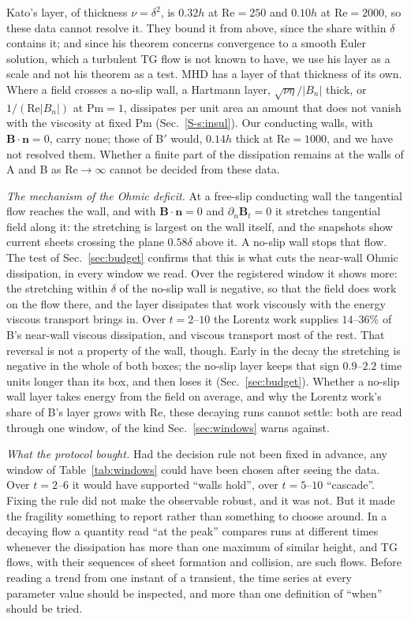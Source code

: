 \documentclass[aip,pop,reprint,amsmath,amssymb,superscriptaddress,floatfix]{revtex4-2}
\newcommand{\Rey}{\mathrm{Re}}
\newcommand{\BB}{\bm{B}}
\begin{document}
Kato's layer, of thickness $\nu=\delta^2$, is $0.32h$ at $\Rey=250$ and $0.10h$ at
$\Rey=2000$, so these data cannot resolve it. They bound it from above, since the
share within $\delta$ contains it; and since his theorem concerns convergence to a
smooth Euler solution,\cite{kato1984} which a turbulent TG flow is not known to have,
we use his layer as a scale and not his theorem as a test. MHD has a layer of that
thickness of its own. Where a field crosses a no-slip wall, a Hartmann
layer,\cite{sommeria1982,knaepen2008} $\sqrt{\nu\eta}/|B_n|$ thick, or $1/(\Rey|B_n|)$
at $\mathrm{Pm}=1$, dissipates per unit area an amount that does not vanish with the
viscosity at fixed $\mathrm{Pm}$ (Sec.~\ref{S-s:insul}). Our conducting walls, with
$\BB\cdot\bm{n}=0$, carry none; those of B$'$ would, $0.14h$ thick at $\Rey=1000$, and
we have not resolved them. Whether a finite part of the dissipation remains at the
walls of A and B as $\Rey\to\infty$ cannot be decided from these data.

\emph{The mechanism of the Ohmic deficit.} At a free-slip conducting wall the
tangential flow reaches the wall, and with $\BB\cdot\bm{n}=0$ and
$\partial_n\BB_t=0$ it stretches tangential field along it: the stretching is
largest on the wall itself, and the snapshots show current sheets crossing the plane
$0.58\delta$ above it. A no-slip wall stops that flow. The test of
Sec.~\ref{sec:budget} confirms that this is what cuts the near-wall Ohmic
dissipation, in every window we read. Over the registered window it shows more: the
stretching within $\delta$ of the no-slip wall is negative, so that the field does
work on the flow there, and the layer dissipates that work viscously with the energy
viscous transport brings in. Over $t=2$--$10$ the Lorentz work supplies $14$--$36$\%
of B's near-wall viscous dissipation, and viscous transport most of the rest. That
reversal is not a property of the wall, though. Early in the decay the stretching is
negative in the whole of both boxes; the no-slip layer keeps that sign $0.9$--$2.2$
time units longer than its box, and then loses it (Sec.~\ref{sec:budget}). Whether a
no-slip wall layer takes energy from the field on average, and why the Lorentz work's
share of B's layer grows with $\Rey$, these decaying runs cannot settle: both are read
through one window, of the kind Sec.~\ref{sec:windows} warns against.

\emph{What the protocol bought.} Had the decision rule not been fixed in advance, any
window of Table~\ref{tab:windows} could have been chosen after seeing the data. Over
$t=2$--$6$ it would have supported ``walls hold'', over $t=5$--$10$ ``cascade''. Fixing
the rule did not make the observable robust, and it was not. But it made the
fragility something to report rather than something to choose
around.\cite{gelman2014} In a decaying flow a quantity read ``at the peak'' compares
runs at different times whenever the dissipation has more than one maximum of similar
height, and TG flows, with their sequences of sheet formation and
collision,\cite{lee2008,pouquet2010} are such flows. Before reading a trend from one
instant of a transient, the time series at every parameter value should be inspected,
and more than one definition of ``when'' should be tried.
\end{document}
